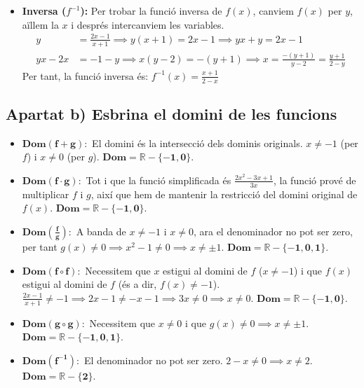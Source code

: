 \documentclass[12pt,a4paper]{article}
\begin{document}
\begin{itemize}[leftmargin=*]
    \item \textbf{Inversa ($f^{-1}$):}
    Per trobar la funció inversa de $f(x)$, canviem $f(x)$ per $y$, aïllem la $x$ i després intercanviem les variables.
    \begin{align*}
    y &= \frac{2x - 1}{x + 1} \implies y(x + 1) = 2x - 1 \implies yx + y = 2x - 1 \\
    yx - 2x &= -1 - y \implies x(y - 2) = -(y + 1) \implies x = \frac{-(y + 1)}{y - 2} = \frac{y + 1}{2 - y}
    \end{align*}
    Per tant, la funció inversa és: \textbf{$f^{-1}(x) = \frac{x + 1}{2 - x}$}
\end{itemize}

\subsection{Apartat b) Esbrina el domini de les funcions}

\begin{itemize}[leftmargin=*]
    \item $\mathbf{Dom(f + g):}$ El domini és la intersecció dels dominis originals. $x \neq -1$ (per $f$) i $x \neq 0$ (per $g$).  $\mathbf{Dom = \mathbb{R} - \{-1, 0\}}$.
    \item $\mathbf{Dom(f \cdot g):}$ Tot i que la funció simplificada és $\frac{2x^2 - 3x + 1}{3x}$, la funció prové de multiplicar $f$ i $g$, així que hem de mantenir la restricció del domini original de $f(x)$. $\mathbf{Dom = \mathbb{R} - \{-1, 0\}}$.
    \item $\mathbf{Dom\left(\frac{f}{g}\right):}$ A banda de $x \neq -1$ i $x \neq 0$, ara el denominador no pot ser zero, per tant $g(x) \neq 0 \implies x^2 - 1 \neq 0 \implies x \neq \pm 1$. $\mathbf{Dom = \mathbb{R} - \{-1, 0, 1\}}$.
    \item $\mathbf{Dom(f \circ f):}$ Necessitem que $x$ estigui al domini de $f$ ($x \neq -1$) i que $f(x)$ estigui al domini de $f$ (és a dir, $f(x) \neq -1$). $\frac{2x-1}{x+1} \neq -1 \implies 2x - 1 \neq -x - 1 \implies 3x \neq 0 \implies x \neq 0$. $\mathbf{Dom = \mathbb{R} - \{-1, 0\}}$.
    \item $\mathbf{Dom(g \circ g):}$ Necessitem que $x \neq 0$ i que $g(x) \neq 0 \implies x \neq \pm 1$. $\mathbf{Dom = \mathbb{R} - \{-1, 0, 1\}}$.
    \item $\mathbf{Dom(f^{-1}):}$ El denominador no pot ser zero. $2 - x \neq 0 \implies x \neq 2$. $\mathbf{Dom = \mathbb{R} - \{2\}}$.
\end{itemize}
\end{document}
